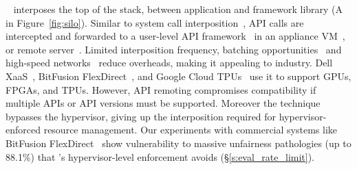 \label{s:bg_api_remoting}
\label{s:bitfusion}
~\cite{gVirtuS,gupta2009gvim,VCL,duato2009efficient,li2011gpu,GridCuda,cu2rcu,xiao2012transparent,gupta2011pegasus,vcorfu}
interposes the top of the stack, between application and framework library (A in Figure~\ref{fig:silo}).
Similar to system call interposition~\cite{paradice, nooks, rio, vrio},
API calls are intercepted and forwarded to a user-level API framework~\cite{vCUDA} in an appliance VM~\cite{vmCUDA}, or remote server~\cite{rCUDA,kim2012snucl}.
Limited interposition frequency, batching opportunities~\cite{rCUDA} and high-speed networks~\cite{deplyrcuda, bitfusion} reduce overheads,
making it appealing to industry.
Dell XaaS~\cite{xaas}, BitFusion FlexDirect~\cite{bitfusion}, and Google Cloud TPUs~\cite{cloud-tpu} use it to support GPUs, FPGAs, and TPUs.
However, API remoting compromises compatibility if multiple APIs or API versions must be supported. Moreover the technique bypasses the hypervisor,
giving up the interposition required for hypervisor-enforced resource management.
Our experiments with commercial systems like BitFusion FlexDirect~\cite{bitfusion} show vulnerability to massive
unfairness pathologies (up to 88.1\%) that \model's hypervisor-level enforcement avoids (\S\ref{s:eval_rate_limit}).

